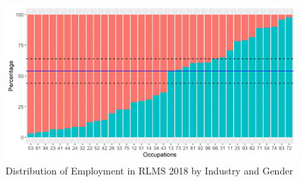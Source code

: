 \documentclass[12pt,a4paper]{article}
\begin{document}
\lipsum[1]

\lipsum[2-3]


\begin{figure}[H]
     \centering
     \hspace*{-0.7in}
     \includegraphics{gen_occ18.png}
  \caption{Distribution of Employment in RLMS 2018 by Industry and Gender}\label{fig:5}
\end{figure}
\end{document}
